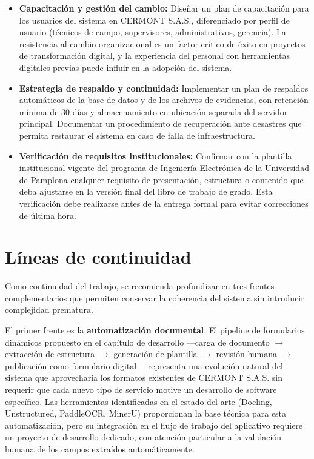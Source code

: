 \begin{itemize}
  \item \textbf{Capacitación y gestión del cambio:} Diseñar un plan de capacitación para los usuarios del sistema en CERMONT S.A.S., diferenciado por perfil de usuario (técnicos de campo, supervisores, administrativos, gerencia). La resistencia al cambio organizacional es un factor crítico de éxito en proyectos de transformación digital, y la experiencia del personal con herramientas digitales previas puede influir en la adopción del sistema.
  
  \item \textbf{Estrategia de respaldo y continuidad:} Implementar un plan de respaldos automáticos de la base de datos y de los archivos de evidencias, con retención mínima de 30 días y almacenamiento en ubicación separada del servidor principal. Documentar un procedimiento de recuperación ante desastres que permita restaurar el sistema en caso de falla de infraestructura.
  
  \item \textbf{Verificación de requisitos institucionales:} Confirmar con la plantilla institucional vigente del programa de Ingeniería Electrónica de la Universidad de Pamplona cualquier requisito de presentación, estructura o contenido que deba ajustarse en la versión final del libro de trabajo de grado. Esta verificación debe realizarse antes de la entrega formal para evitar correcciones de última hora.
\end{itemize}

\section{Líneas de continuidad}

Como continuidad del trabajo, se recomienda profundizar en tres frentes complementarios que permiten conservar la coherencia del sistema sin introducir complejidad prematura.

El primer frente es la \textbf{automatización documental}. El pipeline de formularios dinámicos propuesto en el capítulo de desarrollo —carga de documento $\rightarrow$ extracción de estructura $\rightarrow$ generación de plantilla $\rightarrow$ revisión humana $\rightarrow$ publicación como formulario digital— representa una evolución natural del sistema que aprovecharía los formatos existentes de CERMONT S.A.S. sin requerir que cada nuevo tipo de servicio motive un desarrollo de software específico. Las herramientas identificadas en el estado del arte (Docling, Unstructured, PaddleOCR, MinerU) proporcionan la base técnica para esta automatización, pero su integración en el flujo de trabajo del aplicativo requiere un proyecto de desarrollo dedicado, con atención particular a la validación humana de los campos extraídos automáticamente.

